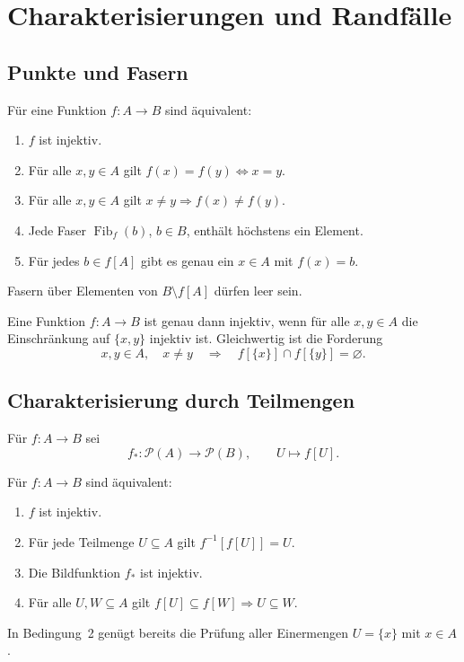 \chapter{Charakterisierungen und Randfälle}
\label{b06guide:ch:criteria}

\section{Punkte und Fasern}

\begin{theorem}
\label{b06guide:thm:pointcriteria}
Für eine Funktion $f\colon A\to B$ sind äquivalent:
\begin{enumerate}
\item $f$ ist injektiv.
\item Für alle $x,y\in A$ gilt
      $f(x)=f(y)\Longleftrightarrow x=y$.
\item Für alle $x,y\in A$ gilt
      $x\ne y\Rightarrow f(x)\ne f(y)$.
\item Jede Faser $\operatorname{Fib}_f(b)$, $b\in B$,
      enthält höchstens ein Element.
\item Für jedes $b\in f[A]$ gibt es genau ein $x\in A$ mit $f(x)=b$.
\end{enumerate}
Fasern über Elementen von $B\setminus f[A]$ dürfen leer sein.
\end{theorem}

\begin{theorem}
\label{b06guide:thm:twopoints}
Eine Funktion $f\colon A\to B$ ist genau dann injektiv,
wenn für alle $x,y\in A$ die Einschränkung auf $\{x,y\}$
injektiv ist. Gleichwertig ist die Forderung
\[
 x,y\in A,\quad x\ne y
 \quad\Longrightarrow\quad f[\{x\}]\cap f[\{y\}]=\varnothing.
\]
\end{theorem}

\section{Charakterisierung durch Teilmengen}

\begin{definition}
Für $f\colon A\to B$ sei
\[
 f_*\colon\mathcal P(A)\to\mathcal P(B),\qquad U\mapsto f[U].
\]
\end{definition}

\begin{theorem}
\label{b06guide:thm:recoverycriteria}
Für $f\colon A\to B$ sind äquivalent:
\begin{enumerate}
\item $f$ ist injektiv.
\item Für jede Teilmenge $U\subseteq A$ gilt $f^{-1}[f[U]]=U$.
\item Die Bildfunktion $f_*$ ist injektiv.
\item Für alle $U,W\subseteq A$ gilt
      $f[U]\subseteq f[W]\Rightarrow U\subseteq W$.
\end{enumerate}
In Bedingung~2 genügt bereits die Prüfung aller Einermengen
$U=\{x\}$ mit $x\in A$.
\end{theorem}

